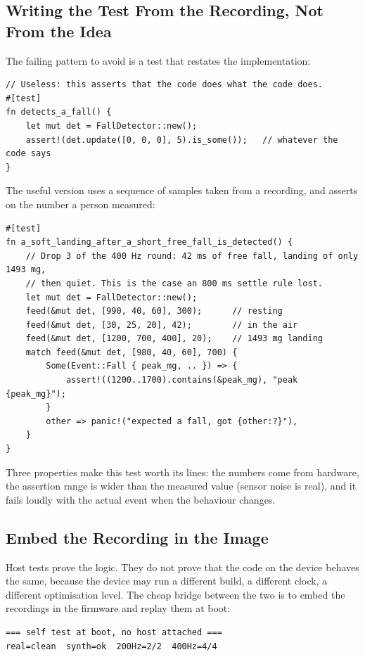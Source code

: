 \subsection{Writing the Test From the Recording, Not From the Idea}

The failing pattern to avoid is a test that restates the implementation:

\begin{verbatim}
// Useless: this asserts that the code does what the code does.
#[test]
fn detects_a_fall() {
    let mut det = FallDetector::new();
    assert!(det.update([0, 0, 0], 5).is_some());   // whatever the code says
}
\end{verbatim}

The useful version uses a sequence of samples taken from a recording, and asserts on the
number a person measured:

\begin{verbatim}
#[test]
fn a_soft_landing_after_a_short_free_fall_is_detected() {
    // Drop 3 of the 400 Hz round: 42 ms of free fall, landing of only 1493 mg,
    // then quiet. This is the case an 800 ms settle rule lost.
    let mut det = FallDetector::new();
    feed(&mut det, [990, 40, 60], 300);      // resting
    feed(&mut det, [30, 25, 20], 42);        // in the air
    feed(&mut det, [1200, 700, 400], 20);    // 1493 mg landing
    match feed(&mut det, [980, 40, 60], 700) {
        Some(Event::Fall { peak_mg, .. }) => {
            assert!((1200..1700).contains(&peak_mg), "peak {peak_mg}");
        }
        other => panic!("expected a fall, got {other:?}"),
    }
}
\end{verbatim}

Three properties make this test worth its lines: the numbers come from hardware, the
assertion range is wider than the measured value (sensor noise is real), and it fails loudly
with the actual event when the behaviour changes.

\subsection{Embed the Recording in the Image}

Host tests prove the logic. They do not prove that the code on the device behaves the same,
because the device may run a different build, a different clock, a different optimisation
level. The cheap bridge between the two is to embed the recordings in the firmware and replay
them at boot:

\begin{verbatim}
=== self test at boot, no host attached ===
real=clean  synth=ok  200Hz=2/2  400Hz=4/4
\end{verbatim}

